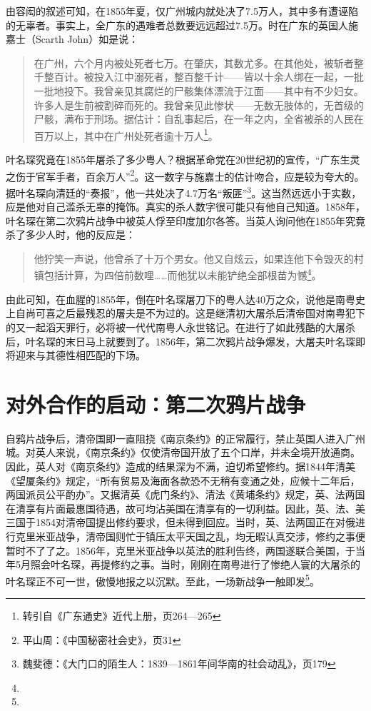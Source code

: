 由容闳的叙述可知，在1855年夏，仅广州城内就处决了7.5万人，其中多有遭诬陷的无辜者。事实上，全广东的遇难者总数要远远超过7.5万。时在广东的英国人施嘉士（Scarth John）如是说：

\begin{quote}
在广州，六个月内被处死者七万。在肇庆，其数尤多。在其他处，被斩者整千整百计。被投入江中溺死者，整百整千计——皆以十余人绑在一起，一批一批地投下。我曾亲见其腐烂的尸骸集体漂流于江面——其中有不少妇女。许多人是生前被割碎而死的。我曾亲见此惨状——无数无肢体的，无首级的尸骸，满布于刑场。据估计：自乱事起后，在一年之内，全省被杀的人民在百万以上，其中在广州处死者逾十万人\footnote{转引自《广东通史》近代上册，页264—265}。

\end{quote}

叶名琛究竟在1855年屠杀了多少粤人？根据革命党在20世纪初的宣传，“广东生灵之伤于官军手者，百余万人”\footnote{平山周：《中国秘密社会史》，页31}。这一数字与施嘉士的估计吻合，应是较为夸大的。据叶名琛向清廷的“奏报”，他一共处决了4.7万名“叛匪”\footnote{魏斐德：《大门口的陌生人：1839—1861年间华南的社会动乱》，页179}。这当然远远小于实数，应是他对自己滥杀无辜的掩饰。真实的杀人数字很可能只有他自己知道。1858年，叶名琛在第二次鸦片战争中被英人俘至印度加尔各答。当英人询问他在1855年究竟杀了多少人时，他的反应是：

\begin{quote}
他狞笑一声说，他曾杀了十万个男女。他又自炫云，如果连他下令毁灭的村镇包括计算，为四倍前数哩……而他犹以未能铲绝全部根苗为憾\footnote{}。

\end{quote}
由此可知，在血腥的1855年，倒在叶名琛屠刀下的粤人达40万之众，说他是南粤史上自尚可喜之后最残忍的屠夫是不为过的。这是继清初大屠杀后清帝国对南粤犯下的又一起滔天罪行，必将被一代代南粤人永世铭记。在进行了如此残酷的大屠杀后，叶名琛的末日马上就要到了。1856年，第二次鸦片战争爆发，大屠夫叶名琛即将迎来与其德性相匹配的下场。

\section{对外合作的启动：第二次鸦片战争}

\indent 自鸦片战争后，清帝国即一直阻挠《南京条约》的正常履行，禁止英国人进入广州城。对英人来说，《南京条约》仅使清帝国开放了五个口岸，并未全境开放通商。因此，英人对《南京条约》造成的结果深为不满，迫切希望修约。据1844年清美《望厦条约》规定，“所有贸易及海面各款恐不无稍有变通之处，应候十二年后，两国派员公平酌办”。又据清英《虎门条约》、清法《黄埔条约》规定，英、法两国在清享有片面最惠国待遇，故可均沾美国在清享有的一切利益。因此，英、法、美三国于1854对清帝国提出修约要求，但未得到回应。当时，英、法两国正在对俄进行克里米亚战争，清帝国则忙于镇压太平天国之乱，均无暇认真交涉，修约之事便暂时不了了之。1856年，克里米亚战争以英法的胜利告终，两国遂联合美国，于当年5月照会叶名琛，再提修约之事。当时，刚刚在南粤进行了惨绝人寰的大屠杀的叶名琛正不可一世，傲慢地报之以沉默。至此，一场新战争一触即发\footnote{}。

